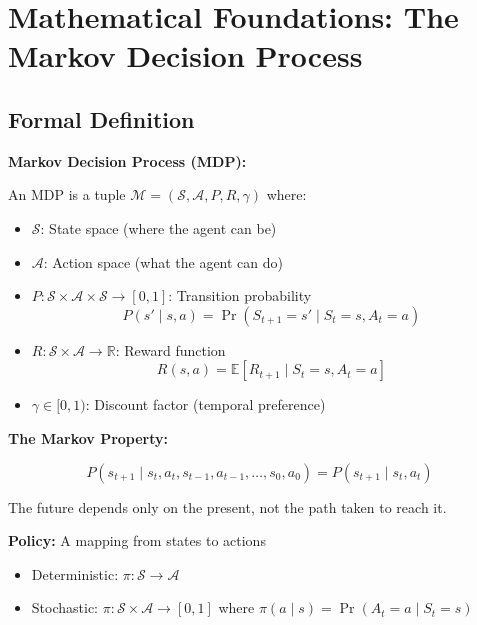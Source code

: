 \section{Mathematical Foundations: The Markov Decision Process}

\subsection{Formal Definition}

\begin{seanbox}{5.1}
\textbf{Markov Decision Process (MDP):}

An MDP is a tuple $\mathcal{M} = (\mathcal{S}, \mathcal{A}, P, R, \gamma)$ where:

\begin{itemize}
    \item $\mathcal{S}$: State space (where the agent can be)
    \item $\mathcal{A}$: Action space (what the agent can do)
    \item $P: \mathcal{S} \times \mathcal{A} \times \mathcal{S} \to [0,1]$: Transition probability
    \begin{equation}
        P(s' \mid s, a) = \Pr(S_{t+1} = s' \mid S_t = s, A_t = a)
    \end{equation}
    
    \item $R: \mathcal{S} \times \mathcal{A} \to \mathbb{R}$: Reward function
    \begin{equation}
        R(s, a) = \mathbb{E}[R_{t+1} \mid S_t = s, A_t = a]
    \end{equation}
    
    \item $\gamma \in [0, 1)$: Discount factor (temporal preference)
\end{itemize}

\textbf{The Markov Property:}

\begin{equation}
    P(s_{t+1} \mid s_t, a_t, s_{t-1}, a_{t-1}, \ldots, s_0, a_0) = P(s_{t+1} \mid s_t, a_t)
\end{equation}

The future depends only on the present, not the path taken to reach it.

\textbf{Policy:} A mapping from states to actions

\begin{itemize}
    \item Deterministic: $\pi: \mathcal{S} \to \mathcal{A}$
    \item Stochastic: $\pi: \mathcal{S} \times \mathcal{A} \to [0, 1]$ where $\pi(a \mid s) = \Pr(A_t = a \mid S_t = s)$
\end{itemize}


\end{seanbox}
